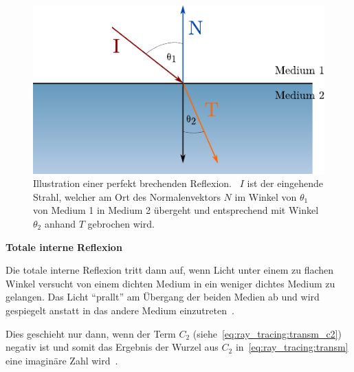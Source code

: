 \begin{figure}[H]\label{fig:ray_tracing_specular_transmission}
    \centering
    \includegraphics{img/perfect_specular_tranmission.pdf}
    \caption{Illustration einer perfekt brechenden
        Reflexion.~\protect\footnotemark{}
        $I$ ist der eingehende Strahl, welcher am Ort des
        Normalenvektors $N$ im Winkel von $\theta_{1}$ von Medium 1 in
        Medium 2 übergeht und entsprechend mit Winkel $\theta_{2}$
        anhand $T$ gebrochen wird.}
\end{figure}

\textbf{Totale interne Reflexion}

Die totale interne Reflexion tritt dann auf, wenn Licht unter einem zu
flachen Winkel versucht von einem dichten Medium in ein weniger dichtes
Medium zu gelangen. Das Licht ``prallt'' am Übergang der beiden Medien ab
und wird gespiegelt anstatt in das andere Medium
einzutreten~\parencite[S. 136 bis 137]{glassner_introduction_1989}.

Dies geschieht nur dann, wenn der Term $C_{2}$
(siehe~\autoref{eq:ray_tracing:transm_c2}) negativ ist und somit das
Ergebnis der Wurzel aus $C_{2}$ in~\ref{eq:ray_tracing:transm} eine
imaginäre Zahl wird~\parencite[S. 137 bis 138]{glassner_introduction_1989}.

